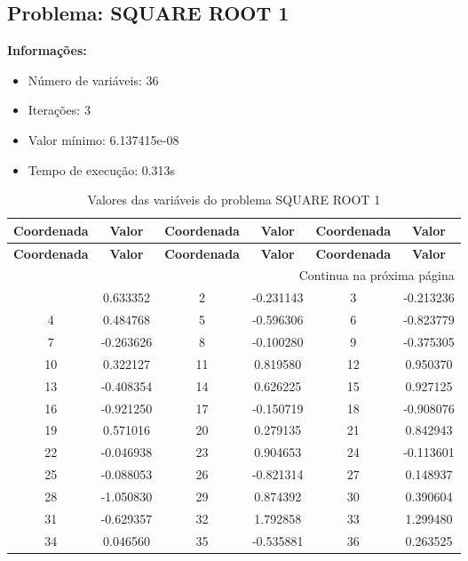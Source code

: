 \documentclass[12pt]{article}
\begin{document}
\newpage            
\subsection{Problema: SQUARE ROOT 1}

\textbf{Informações:}
\begin{itemize}
\item Número de variáveis: 36
\item Iterações: 3
\item Valor mínimo: 6.137415e-08
\item Tempo de execução: 0.313s
\end{itemize}

\small
\begin{longtable}{@{}cc|cc|cc@{}}
\caption{Valores das variáveis do problema SQUARE ROOT 1} \\
\toprule
\textbf{Coordenada} & \textbf{Valor} & \textbf{Coordenada} & \textbf{Valor} & \textbf{Coordenada} & \textbf{Valor} \\
\midrule
\endfirsthead

\toprule
\textbf{Coordenada} & \textbf{Valor} & \textbf{Coordenada} & \textbf{Valor} & \textbf{Coordenada} & \textbf{Valor} \\
\midrule
\endhead

\midrule \multicolumn{6}{r}{{Continua na próxima página}} \\ \midrule
\endfoot

\bottomrule
\endlastfoot
1 & 0.633352 & 2 & -0.231143 & 3 & -0.213236 \\
4 & 0.484768 & 5 & -0.596306 & 6 & -0.823779 \\
7 & -0.263626 & 8 & -0.100280 & 9 & -0.375305 \\
10 & 0.322127 & 11 & 0.819580 & 12 & 0.950370 \\
13 & -0.408354 & 14 & 0.626225 & 15 & 0.927125 \\
16 & -0.921250 & 17 & -0.150719 & 18 & -0.908076 \\
19 & 0.571016 & 20 & 0.279135 & 21 & 0.842943 \\
22 & -0.046938 & 23 & 0.904653 & 24 & -0.113601 \\
25 & -0.088053 & 26 & -0.821314 & 27 & 0.148937 \\
28 & -1.050830 & 29 & 0.874392 & 30 & 0.390604 \\
31 & -0.629357 & 32 & 1.792858 & 33 & 1.299480 \\
34 & 0.046560 & 35 & -0.535881 & 36 & 0.263525 \\

\end{longtable}
\end{document}
